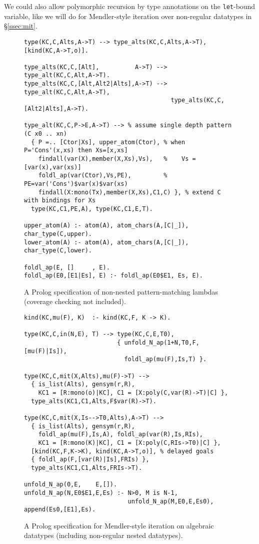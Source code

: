 \documentclass[runningheads,a4paper]{llncs}
\begin{document}
We could also allow polymorphic recursion by type annotations
on the \texttt{let}-bound variable, like we will do for Mendler-style iteration
over non-regular datatypes in \S\ref{ssec:mit}.

\begin{figure} %
\begin{verbatim}
type(KC,C,Alts,A->T) --> type_alts(KC,C,Alts,A->T), [kind(KC,A->T,o)].

type_alts(KC,C,[Alt],          A->T) --> type_alt(KC,C,Alt,A->T).
type_alts(KC,C,[Alt,Alt2|Alts],A->T) --> type_alt(KC,C,Alt,A->T),
                                         type_alts(KC,C,[Alt2|Alts],A->T).

type_alt(KC,C,P->E,A->T) --> % assume single depth pattern (C x0 .. xn)
  { P =.. [Ctor|Xs], upper_atom(Ctor), % when P='Cons'(x,xs) then Xs=[x,xs]
    findall(var(X),member(X,Xs),Vs),   %    Vs = [var(x),var(xs)]  
    foldl_ap(var(Ctor),Vs,PE),         %    PE=var('Cons')$var(x)$var(xs)
    findall(X:mono(Tx),member(X,Xs),C1,C) }, % extend C with bindings for Xs
  type(KC,C1,PE,A), type(KC,C1,E,T).

upper_atom(A) :- atom(A), atom_chars(A,[C|_]), char_type(C,upper).
lower_atom(A) :- atom(A), atom_chars(A,[C|_]), char_type(C,lower).

foldl_ap(E, []     , E).
foldl_ap(E0,[E1|Es], E) :- foldl_ap(E0$E1, Es, E).
\end{verbatim}
\vspace*{-2ex}
\caption{A Prolog specification of non-nested pattern-matching lambdas
$\qquad$ (coverage checking not included).}
\label{fig:patlam}
\end{figure}
\begin{figure} %
\begin{verbatim}
kind(KC,mu(F), K)  :- kind(KC,F, K -> K).

type(KC,C,in(N,E), T) --> type(KC,C,E,T0),
                          { unfold_N_ap(1+N,T0,F,[mu(F)|Is]),
                            foldl_ap(mu(F),Is,T) }.

type(KC,C,mit(X,Alts),mu(F)->T) -->
  { is_list(Alts), gensym(r,R),
    KC1 = [R:mono(o)|KC], C1 = [X:poly(C,var(R)->T)|C] },
  type_alts(KC1,C1,Alts,F$var(R)->T).

type(KC,C,mit(X,Is-->T0,Alts),A->T) -->
  { is_list(Alts), gensym(r,R),
    foldl_ap(mu(F),Is,A), foldl_ap(var(R),Is,RIs),
    KC1 = [R:mono(K)|KC], C1 = [X:poly(C,RIs->T0)|C] },
  [kind(KC,F,K->K), kind(KC,A->T,o)], % delayed goals
  { foldl_ap(F,[var(R)|Is],FRIs) },
  type_alts(KC1,C1,Alts,FRIs->T).

unfold_N_ap(0,E,    E,[]).
unfold_N_ap(N,E0$E1,E,Es) :- N>0, M is N-1,
                             unfold_N_ap(M,E0,E,Es0), append(Es0,[E1],Es).
\end{verbatim}
\vspace*{-1ex}
\caption{A Prolog specification for Mendler-style iteration
  on algebraic datatypes (including non-regular nested datatypes).}
\label{fig:mit}
\end{figure}
\end{document}
